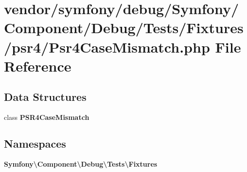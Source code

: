 \section{vendor/symfony/debug/\+Symfony/\+Component/\+Debug/\+Tests/\+Fixtures/psr4/\+Psr4\+Case\+Mismatch.php File Reference}
\label{_psr4_case_mismatch_8php}
\subsection*{Data Structures}
\begin{DoxyCompactItemize}
\item 
class {\bf P\+S\+R4\+Case\+Mismatch}
\end{DoxyCompactItemize}
\subsection*{Namespaces}
\begin{DoxyCompactItemize}
\item 
 {\bf Symfony\textbackslash{}\+Component\textbackslash{}\+Debug\textbackslash{}\+Tests\textbackslash{}\+Fixtures}
\end{DoxyCompactItemize}
